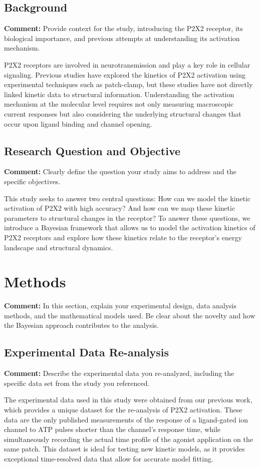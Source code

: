\documentclass{article}
\begin{document}
	\subsection{Background}
	\textbf{Comment:} Provide context for the study, introducing the P2X2 receptor, its biological importance, and previous attempts at understanding its activation mechanism.
	
	P2X2 receptors are involved in neurotransmission and play a key role in cellular signaling. Previous studies have explored the kinetics of P2X2 activation using experimental techniques such as patch-clamp, but these studies have not directly linked kinetic data to structural information. Understanding the activation mechanism at the molecular level requires not only measuring macroscopic current responses but also considering the underlying structural changes that occur upon ligand binding and channel opening.
	
	\subsection{Research Question and Objective}
	\textbf{Comment:} Clearly define the question your study aims to address and the specific objectives.
	
	This study seeks to answer two central questions: How can we model the kinetic activation of P2X2 with high accuracy? And how can we map these kinetic parameters to structural changes in the receptor? To answer these questions, we introduce a Bayesian framework that allows us to model the activation kinetics of P2X2 receptors and explore how these kinetics relate to the receptor's energy landscape and structural dynamics.
	
	\section{Methods}
	\textbf{Comment:} In this section, explain your experimental design, data analysis methods, and the mathematical models used. Be clear about the novelty and how the Bayesian approach contributes to the analysis.
	
	\subsection{Experimental Data Re-analysis}
	\textbf{Comment:} Describe the experimental data you re-analyzed, including the specific data set from the study you referenced.
	
	The experimental data used in this study were obtained from our previous work, which provides a unique dataset for the re-analysis of P2X2 activation. These data are the only published measurements of the response of a ligand-gated ion channel to ATP pulses shorter than the channel's response time, while simultaneously recording the actual time profile of the agonist application on the same patch. This dataset is ideal for testing new kinetic models, as it provides exceptional time-resolved data that allow for accurate model fitting.
	
\end{document}
